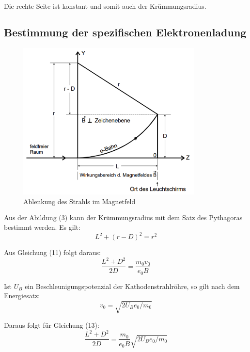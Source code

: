 Die rechte Seite ist konstant und somit auch der Krümmungsradius.


\subsection{Bestimmung der spezifischen Elektronenladung}

\begin{figure}[H]
  \centering
  \includegraphics[height=8cm]{ablenkungbfeld.PNG}
  \caption{Ablenkung des Strahls im Magnetfeld}
  \label{fig:ablenkungbfeld}
\end{figure}

Aus der Abildung (3) kann der Krümmungsradius mit dem Satz des Pythagoras bestimmt werden.
Es gilt:
\begin{equation}
  L^2 + (r - D)^2 = r^2
\end{equation}

Aus Gleichung (11) folgt daraus:
\begin{equation}
  \frac{L^2 + D^2}{2D} = \frac{m_0 v_0}{e_0 B}
\end{equation}

Ist $U_B$ ein Beschleunigungspotenzial der Kathodenstrahlröhre, so gilt nach dem Energiesatz:
\begin{equation}
  v_0 = \sqrt{2U_B e_0/m_0}
\end{equation}

Daraus folgt für Gleichung (13):
\begin{equation}
  \frac{L^2 + D^2}{2D} = \frac{m_0}{e_0 B} \sqrt{2U_B e_0/m_0}
\end{equation}
